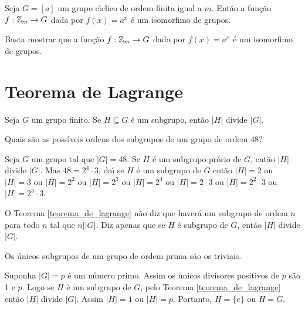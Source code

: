 \begin{corolario}
    Seja $G = [a]$ um grupo c{\'\i}clico de ordem finita igual a $m$. Ent\~ao a fun\c{c}\~ao $f : \mathbb{Z}_m \to G$ dada por $f(\overline{x}) = a^x$ \'e um isomorfimo de grupos.
\end{corolario}
\begin{prova}
	Basta mostrar que a função $f : \mathbb{Z}_m \to G$ dada por $f(\overline{x}) = a^x$ é um isomorfimo de grupos.
\end{prova}

\section{Teorema de Lagrange}

\begin{teorema}\label{teorema_de_lagrange}
	Seja $G$ um grupo finito. Se $H\subseteq G$ {\'e} um subgrupo, ent{\~a}o $|H|$ divide $|G|$.
\end{teorema}

\begin{exemplo}
	Quais s{\~a}o as poss{\'\i}veis ordens dos subgrupos de um grupo de ordem 48?
	\begin{solucao}
		Seja $G$ um grupo tal que $|G|=48$. Se $H$ {\'e} um subgrupo pr\'orio de $G$, ent{\~a}o $|H|$ divide $|G|$. Mas $48=2^{4}\cdot 3$, da{\'\i} se $H$ \'e um subgrupo de $G$ ent\~ao $|H|=2$ ou $|H|=3$ ou $|H|= 2^{2}$ ou $|H|=2^{3}$ ou $|H|=2^{4}$ ou $|H|=2\cdot3$ ou $|H|=2^2\cdot 3$ ou $|H|=2^3\cdot 3$.
	\end{solucao}
\end{exemplo}

\begin{observacao}
	O Teorema \ref{teorema_de_lagrange} n{\~a}o diz que haver{\'a} um subgrupo de ordem $n$ para todo $n$ tal que $n||G|$. Diz apenas que se $H$ {\'e} subgrupo de $G$, ent{\~a}o $|H|$ divide $|G|$.
\end{observacao}

\begin{corolario}
	Os {\'u}nicos subgrupos de um grupo de ordem prima s{\~a}o os triviais.
\end{corolario}
\begin{prova}
	Suponha $|G| = p$ \'e um n\'umero primo. Assim os {\'u}nicos divisores positivos de $p$ s{\~a}o 1 e $p$. Logo se $H$ {\'e} um subgrupo de $G$, pelo Teorema \ref{teorema_de_lagrange} ent{\~a}o $|H|$ divide $|G|$. Assim $|H| = 1$ ou $|H| = p$. Portanto, $H=\{e\}$ ou $H = G$.
\end{prova}





